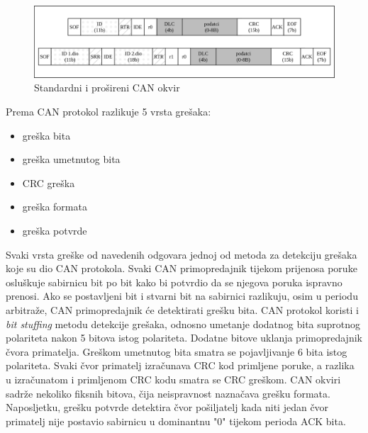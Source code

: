 \documentclass[times, utf8, diplomski, numeric]{fer}
\begin{document}
\begin{figure}[htb]
\centering
\includegraphics[width=\textwidth]{slike/CAN_okvir.png}
\caption{Standardni i prošireni CAN okvir}
\label{fig:CAN_okvir}
\end{figure}
\newpage
Prema \cite{bosch1991} CAN protokol razlikuje 5 vrsta grešaka:
\begin{itemize}
    \item greška bita 
    \item greška umetnutog bita 
    \item CRC greška 
    \item greška formata 
    \item greška potvrde 
\end{itemize}

Svaki vrsta greške od navedenih odgovara jednoj od metoda za detekciju grešaka koje su dio CAN protokola. Svaki CAN primopredajnik tijekom prijenosa poruke osluškuje sabirnicu bit po bit kako bi potvrdio da se njegova poruka ispravno prenosi. Ako se postavljeni bit i stvarni bit na sabirnici razlikuju, osim u periodu arbitraže, CAN primopredajnik će detektirati grešku bita. CAN protokol koristi i \textit{bit stuffing} metodu detekcije grešaka, odnosno umetanje dodatnog bita suprotnog polariteta nakon 5 bitova istog polariteta. Dodatne bitove uklanja primopredajnik čvora primatelja. Greškom umetnutog bita smatra se pojavljivanje 6 bita istog polariteta. Svaki čvor primatelj izračunava CRC kod primljene poruke, a razlika u izračunatom i primljenom CRC kodu smatra se CRC greškom. CAN okviri sadrže nekoliko fiksnih bitova, čija neispravnost naznačava grešku formata. Naposljetku, grešku potvrde detektira čvor pošiljatelj kada niti jedan čvor primatelj nije postavio sabirnicu u dominantnu "0" tijekom perioda ACK bita.
\end{document}
